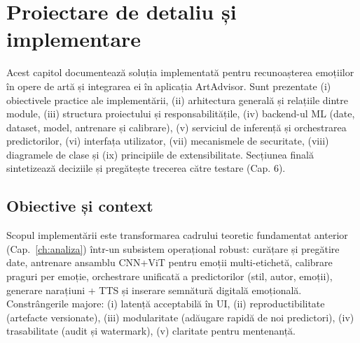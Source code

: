 \chapter{Proiectare de detaliu și implementare}
\label{ch:design_impl}


Acest capitol documentează soluția implementată pentru recunoașterea emoțiilor în opere de artă și integrarea ei în aplicația ArtAdvisor. Sunt prezentate (i) obiectivele practice ale implementării, (ii) arhitectura generală și relațiile dintre module, (iii) structura proiectului și responsabilitățile, (iv) backend-ul ML (date, dataset, model, antrenare și calibrare), (v) serviciul de inferență și orchestrarea predictorilor, (vi) interfața utilizator, (vii) mecanismele de securitate, (viii) diagramele de clase și (ix) principiile de extensibilitate. Secțiunea finală sintetizează deciziile și pregătește trecerea către testare (Cap. 6).

\bigskip

\newcommand{\boxblock}[2][0.86\linewidth]{\fbox{\parbox{#1}{\centering #2}}}
\newcommand{\smallbox}[2][0.38\linewidth]{\fbox{\parbox{#1}{\centering #2}}}

\section{Obiective și context}\label{sec:c5-context}
Scopul implementării este transformarea cadrului teoretic fundamentat anterior (Cap.~\ref{ch:analiza}) într-un subsistem operațional robust: curățare și pregătire date, antrenare ansamblu CNN+ViT pentru emoții multi-etichetă, calibrare praguri per emoție, orchestrare unificată a predictorilor (stil, autor, emoții), generare narațiuni + TTS și inserare semnătură digitală emoțională. Constrângerile majore: (i) latență acceptabilă în UI, (ii) reproductibilitate (artefacte versionate), (iii) modularitate (adăugare rapidă de noi predictori), (iv) trasabilitate (audit și watermark), (v) claritate pentru mentenanță.

